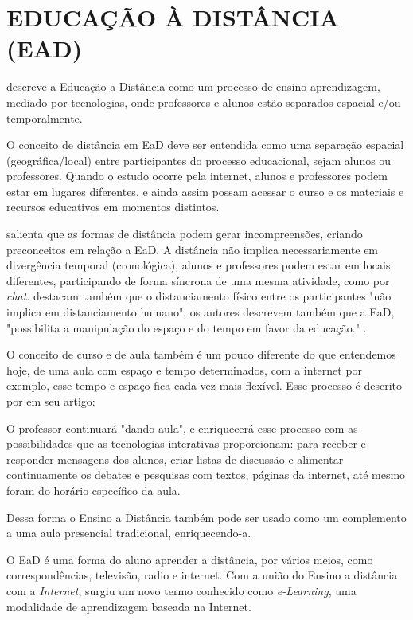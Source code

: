 \section{EDUCAÇÃO À DISTÂNCIA (EAD)}

 descreve a Educação a Distância como um processo de ensino-aprendizagem, mediado por tecnologias, onde professores e alunos estão separados espacial e/ou temporalmente.
\par
O conceito de distância em EaD deve ser entendida como uma separação espacial (geográfica/local) entre participantes do processo educacional, sejam alunos ou professores. Quando o estudo ocorre pela internet, alunos e professores podem estar em lugares diferentes, e ainda assim possam acessar o curso e os materiais e recursos educativos em momentos distintos.
\par
{} salienta que as formas de distância podem gerar incompreensões, criando preconceitos em relação a EaD. A distância não implica necessariamente em divergência temporal (cronológica), alunos e professores podem estar em locais diferentes, participando de forma síncrona de uma mesma atividade, como por \textit{chat}.   destacam também que o distanciamento físico entre os participantes "não implica em distanciamento humano", os autores descrevem também que a EaD, "possibilita a manipulação do espaço e do tempo em favor da educação." .
\par
O conceito de curso e de aula também é um pouco diferente do que entendemos hoje, de uma aula com espaço e tempo determinados, com a internet por exemplo, esse tempo e espaço fica cada vez mais flexível. Esse processo é descrito por  em seu artigo:
\begin{citacao}
  O professor continuará "dando aula", e enriquecerá esse processo com as possibilidades que as tecnologias interativas proporcionam: para receber e responder mensagens dos alunos, criar listas de discussão e alimentar continuamente os debates e pesquisas com textos, páginas da internet, até mesmo foram do horário específico da aula.
\end{citacao}
\par
Dessa forma o Ensino a Distância também pode ser usado como um complemento a uma aula presencial tradicional, enriquecendo-a.
\par
O EaD é uma forma do aluno aprender a distância, por vários meios, como correspondências, televisão, radio e internet. Com a união do Ensino a distância com a \textit{Internet}, surgiu um novo termo conhecido como \textit{e-Learning}, uma modalidade de aprendizagem baseada na Internet.

